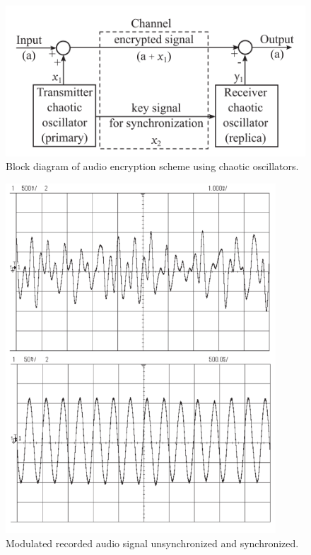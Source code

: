 \begin{minipage}{0.55\textwidth}
    \begin{figure}[h]
    \centering
    \includegraphics[width=1\textwidth]{images/e_in-out_synchro.png}
    \caption{ Block diagram of audio encryption scheme using chaotic oscillators.}
\end{figure}
\end{minipage}
\hfill
\begin{minipage}{0.35\textwidth}
    \begin{figure}[h]
        \centering
        \includegraphics[width=0.9\textwidth]{images/e_sin_recover.png}
        \caption{Modulated recorded audio signal unsynchronized and synchronized.}
    \end{figure}
\end{minipage}
